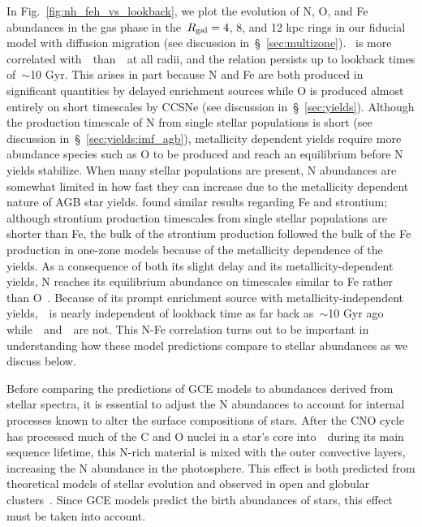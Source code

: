 \documentclass[ms.tex]{subfiles}
\begin{document}
In Fig.~\ref{fig:nh_feh_vs_lookback}, we plot the evolution of N, O, and Fe
abundances in the gas phase in the~$R_\text{gal} = 4$, 8, and 12 kpc rings in our
fiducial model with diffusion migration (see discussion
in~\S~\ref{sec:multizone}).
\nh~is more correlated with~\feh~than~\oh~at all radii, and the relation
persists up to lookback times of~$\sim$10 Gyr.
This arises in part because N and Fe are both produced in significant
quantities by delayed enrichment sources while O is produced almost entirely on
short timescales by CCSNe (see discussion in~\S~\ref{sec:yields}).
Although the production timescale of N from single stellar populations is
short (see discussion in~\S~\ref{sec:yields:imf_agb}), metallicity dependent
yields require more abundance species such as O to be produced and reach an
equilibrium before N yields stabilize.
When many stellar populations are present, N abundances are somewhat limited
in how fast they can increase due to the metallicity dependent nature of AGB
star yields.
\citet{Johnson2020} found similar results regarding Fe and strontium; although
strontium production timescales from single stellar populations are shorter
than Fe, the bulk of the strontium production followed the bulk of the Fe
production in one-zone models because of the metallicity dependence of the
yields.
As a consequence of both its slight delay and its metallicity-dependent
yields, N reaches its equilibrium abundance on timescales similar to Fe rather
than O~\citep{Weinberg2017}.
Because of its prompt enrichment source with metallicity-independent
yields,~\oh~is nearly independent of lookback time as far back as~$\sim$10 Gyr
ago while~\nh~and~\feh~are not.
This N-Fe correlation turns out to be important in understanding how these
model predictions compare to stellar abundances as we discuss below.
\par
Before comparing the predictions of GCE models to abundances derived from
stellar spectra, it is essential to adjust the N abundances to account for
internal processes known to alter the surface compositions of stars.
After the CNO cycle has processed much of the C and O nuclei in a star's core
into~\Nfourteen~during its main sequence lifetime, this N-rich material is
mixed with the outer convective layers, increasing the N abundance in the
photosphere.
This effect is both predicted from theoretical models of stellar evolution and
observed in open and globular clusters~\citep{Gilroy1989, Korn2007, Lind2008,
Souto2018, Souto2019}.
Since GCE models predict the birth abundances of stars, this effect must be
taken into account.
\end{document}
